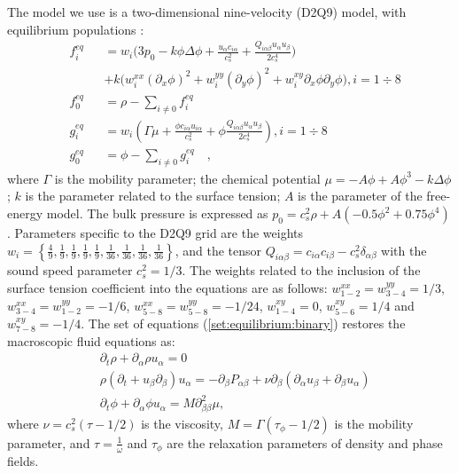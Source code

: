 \documentclass[preprint,12pt]{elsarticle}
\begin{document}
The model we use is a two-dimensional nine-velocity (D2Q9) model,
with equilibrium populations \cite{pooley-contact}:
\begin{equation}
\label{set:equilibrium:binary}
\begin{aligned}
&f_i^{eq}&&=w_i 
\biggl(3
p_0 - k \phi \Delta \phi
+\frac{u_{\alpha}c_{i\alpha}}{c_s^2}+\frac{Q_{i\alpha\beta}u_{\alpha } u_ {
\beta}}{2 c_s^4}\biggr)\\
&&&+k\bigl(w_i^{xx} (\partial_x \phi)^2+w_i^{yy} (\partial_y \phi)^2 +w_i^{xy} \partial_x
\phi \partial_y \phi \bigr), i=1\div8\\
&f_0^{eq}&&=\rho-\sum_{i\neq0}{f_i^{eq}}\\
&g_i^{eq}&&=w_i\left(\Gamma \mu + \frac{\phi c_{i\alpha} u_{i\alpha}}{c_s^2}+\phi
\frac{Q_{i\alpha\beta}u_{\alpha}u_{\beta}}{2 c_s^4}\right), i=1\div8 \\
&g_0^{eq}&&=\phi-\sum_{i\neq0}{g_i^{eq}}\quad,
\end{aligned}
\end{equation}
where $\Gamma$ is the mobility parameter; the chemical potential
$\mu=-A\phi+A\phi^3-k\Delta\phi$; $k$ is the parameter related to the surface
tension; $A$ is the parameter of the free-energy model. The bulk pressure
is expressed as $p_0=c_s^2 \rho +A (-0.5 \phi^2+0.75 \phi^4)$. 
Parameters specific to the D2Q9 grid are the weights
$w_i=\left\{\frac{4}{9},\frac{1}{9},\frac{1}{9},\frac{1}{9},\frac{1}{9},
\frac{1}{36},\frac{1}{36},\frac{1}{36},\frac{1}{36}\right\}$, and the tensor
$Q_{i\alpha\beta}=c_{i\alpha} c_{i\beta} - c_s^2 \delta_{\alpha\beta}$ with
the sound speed parameter $c_s^2=1/3$.  The weights related to the
inclusion of the surface tension coefficient into the equations are as follows:
$w^{xx}_{1-2}=w^{yy}_{3-4}=1/3$, $w^{xx}_{3-4}=w^{yy}_{1-2}=-1/6$,
$w^{xx}_{5-8}=w^{yy}_{5-8}=-1/24$, $w^{xy}_{1-4}=0$, $w^{xy}_{5-6}=1/4$ and
$w^{xy}_{7-8}=-1/4$. The set of equations (\ref{set:equilibrium:binary}) restores the
macroscopic
fluid equations as:
\begin{equation}
\begin{aligned}
&\partial_t \rho+ \partial_{\alpha} \rho u_{\alpha}=0\\
&\rho\left(\partial_t+u_{\beta}\partial_{\beta}\right) u_{\alpha}=
-\partial_{\beta}P_{\alpha \beta} +
\nu\partial_{\beta}\left(\partial_{\alpha}u_{\beta}+\partial_{\beta} u_{\alpha}\right)\\
&\partial_t \phi + \partial_{\alpha} \phi u_{\alpha}=M \partial^2_{\beta\beta} \mu,
\end{aligned}
\label{binary:fluid:system}
\end{equation}
where $\nu=c_s^2 (\tau-1/2)$ is the viscosity,
$M=\Gamma(\tau_{\phi}-1/2)$ is the mobility parameter, and $\tau=\frac{1}{\omega}$ and $\tau_{\phi}$
are the relaxation parameters of density and phase fields. 
\end{document}
